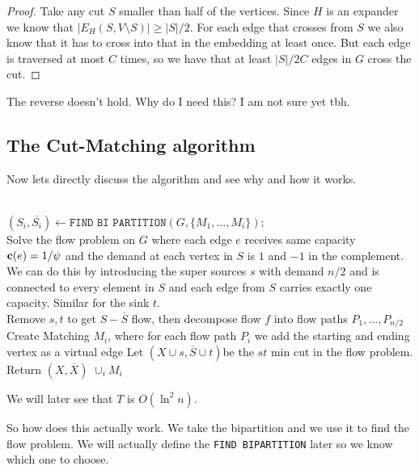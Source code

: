 \begin{proof}
    Take any cut $S$ smaller than half of the vertices. Since $H$ is an expander we know that $|E_H ( S, V \setminus S)| \geq |S|/2$. For each edge that crosses from $S$ we also know that it has to cross into that in the embedding at least once. But each edge is traversed at most $C$ times, so we have that at least $|S|/2C$ edges in $G$ cross the cut.
\end{proof}

The reverse doesn't hold. Why do I need this? I am not sure yet tbh.

\subsection{The Cut-Matching algorithm}

Now lets directly discuss the algorithm and see why and how it works.


\begin{algorithm}
\caption{SPARSITYCERTIFYORCUT}\label{alg:sparsitycertifycut}
\begin{algorithmic}
 \\
\State $(S_i, \overline{S_i}) \gets \texttt{FIND BI PARTITION}(G, \{M_1, \ldots, M_i\});$
\\
\State Solve the flow problem on $G$ where each edge $e$ receives same capacity $\mathbf{c} (e) = 1/\psi $ and the demand at each vertex in $S$ is $1$ and $-1$ in the complement. We can do this by introducing the super sources $s$ with demand $n/2$ and is connected to every element in $S$ and each edge from $S$ carries exactly one capacity. Similar for the sink $t$.
\\
    \State Remove $s,t$ to get $S-\overline{S}$ flow, then decompose flow $f$ into flow paths $P_1, \ldots, P_{n/2}$
    \State Create Matching $M_i$, where for each flow path $P_i$ we add the starting and ending vertex as a virtual edge
\Else
    \State Let $(X \cup s, \overline{S} \cup t)$be the $st$ min cut in the flow problem.
    \State Return $(X, \overline{X})$
\EndIf
\EndFor
\State \Return $\cup _i M_i$
\end{algorithmic}
\end{algorithm}


We will later see that $T$ is $O(\ln ^2 n)$.

So how does this actually work. We take the bipartition and we use it to find the flow problem. We will actually define the \texttt{FIND BIPARTITION} later so we know which one to choose.

